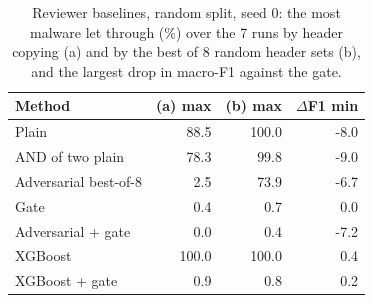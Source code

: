 \begin{table}[t]
\centering
\caption{Reviewer baselines, random split, seed 0: the most malware let through (\%) over the 7 runs by header copying (a) and by the best of 8 random header sets (b), and the largest drop in macro-F1 against the gate.}
\label{tab:baselines}
\setlength{\tabcolsep}{4pt}
\begin{tabular}{lrrr}
\toprule
Method & (a) max & (b) max & $\Delta$F1 min \\
\midrule
Plain & 88.5 & 100.0 & -8.0 \\
AND of two plain & 78.3 & 99.8 & -9.0 \\
Adversarial best-of-8 & 2.5 & 73.9 & -6.7 \\
Gate & 0.4 & 0.7 & 0.0 \\
Adversarial + gate & 0.0 & 0.4 & -7.2 \\
XGBoost & 100.0 & 100.0 & 0.4 \\
XGBoost + gate & 0.9 & 0.8 & 0.2 \\
\bottomrule
\end{tabular}
\end{table}
